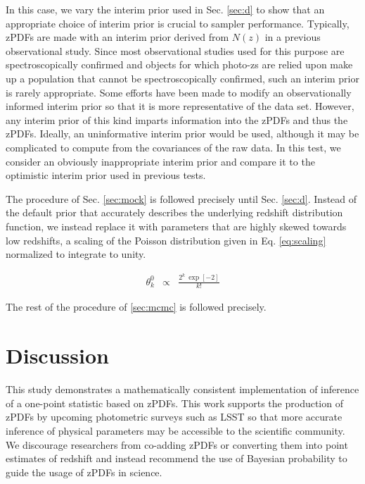 \documentclass[preprint]{aastex}
\begin{document}
In this case, we vary the interim prior used in Sec. \ref{sec:d} to show that an appropriate choice of interim prior is crucial to sampler performance.  Typically, zPDFs are made with an interim prior derived from $N(z)$ in a previous observational study.  Since most observational studies used for this purpose are spectroscopically confirmed and objects for which photo-zs are relied upon make up a population that cannot be spectroscopically confirmed, such an interim prior is rarely appropriate.  Some efforts have been made to modify an observationally informed interim prior so that it is more representative of the data set.  \citep{she11}  However, any interim prior of this kind imparts information into the zPDFs and thus the zPDFs.  Ideally, an uninformative interim prior would be used, although it may be complicated to compute from the covariances of the raw data.  In this test, we consider an obviously inappropriate interim prior and compare it to the optimistic interim prior used in previous tests.

The procedure of Sec. \ref{sec:mock} is followed precisely until Sec. \ref{sec:d}.  Instead of the default prior that accurately describes the underlying redshift distribution function, we instead replace it with parameters that are highly skewed towards low redshifts, a scaling of the Poisson distribution given in Eq. \ref{eq:scaling} normalized to integrate to unity.

\begin{eqnarray}
\label{eq:scaling}
\theta^{0}_{k} &\propto& \frac{2^{k}\ \exp[-2]}{k!}
\end{eqnarray}

The rest of the procedure of \ref{sec:mcmc} is followed precisely.

\clearpage
\section{Discussion}
\label{sec:disc}

This study demonstrates a mathematically consistent implementation of inference of a one-point statistic based on zPDFs.  This work supports the production of zPDFs by upcoming photometric surveys such as LSST so that more accurate inference of physical parameters may be accessible to the scientific community.  We discourage researchers from co-adding zPDFs or converting them into point estimates of redshift and instead recommend the use of Bayesian probability to guide the usage of zPDFs in science.
\end{document}
